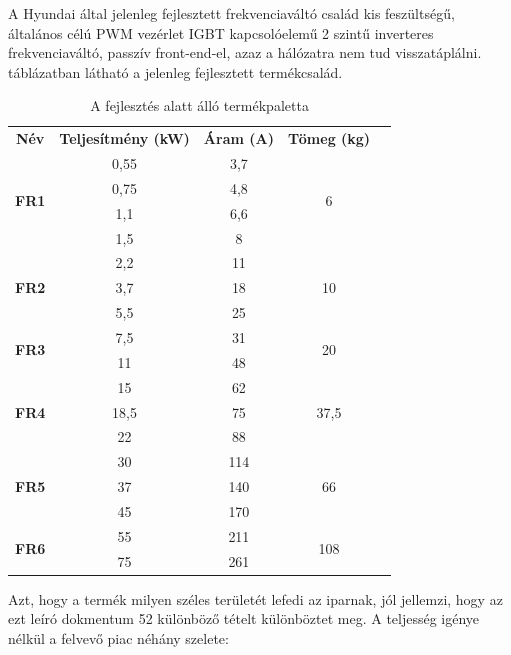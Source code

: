 A Hyundai által jelenleg fejlesztett frekvenciaváltó család kis feszültségű, általános célú PWM vezérlet IGBT kapcsolóelemű 2 szintű inverteres frekvenciaváltó, passzív front-end-el, azaz a hálózatra nem tud visszatáplálni.  táblázatban látható a jelenleg fejlesztett termékcsalád.

\begin{table}[]
\centering
\begin{tabular}{|c|c|c|c|l}
\cline{1-4}
\textbf{Név} & \textbf{Teljesítmény (kW)} & \textbf{Áram (A)} & \textbf{Tömeg (kg)} &  \\ \cline{1-4}
\multirow{4}{*}{\textbf{FR1}} & 0,55 & 3,7 & \multirow{4}{*}{6} &  \\ \cline{2-3}
 & 0,75 & 4,8 &  &  \\ \cline{2-3}
 & 1,1 & 6,6 &  &  \\ \cline{2-3}
 & 1,5 & 8 &  &  \\ \cline{1-4}
\multirow{3}{*}{\textbf{FR2}} & 2,2 & 11 & \multirow{3}{*}{10} &  \\ \cline{2-3}
 & 3,7 & 18 &  &  \\ \cline{2-3}
 & 5,5 & 25 &  &  \\ \cline{1-4}
\multirow{2}{*}{\textbf{FR3}} & 7,5 & 31 & \multirow{2}{*}{20} &  \\ \cline{2-3}
 & 11 & 48 &  &  \\ \cline{1-4}
\multirow{3}{*}{\textbf{FR4}} & 15 & 62 & \multirow{3}{*}{37,5} &  \\ \cline{2-3}
 & 18,5 & 75 &  &  \\ \cline{2-3}
 & 22 & 88 &  &  \\ \cline{1-4}
\multirow{3}{*}{\textbf{FR5}} & 30 & 114 & \multirow{3}{*}{66} &  \\ \cline{2-3}
 & 37 & 140 &  &  \\ \cline{2-3}
 & 45 & 170 &  &  \\ \cline{1-4}
\multirow{2}{*}{\textbf{FR6}} & 55 & 211 & \multirow{2}{*}{108} &  \\ \cline{2-3}
 & 75 & 261 &  &  \\ \cline{1-4}
\end{tabular}
\caption{A fejlesztés alatt álló termékpaletta}
\label{fig:family}
\end{table}

Azt, hogy a termék milyen széles területét lefedi az iparnak, jól jellemzi, hogy az ezt leíró dokmentum 52 különböző tételt különböztet meg. A teljesség igénye nélkül a felvevő piac néhány szelete:

